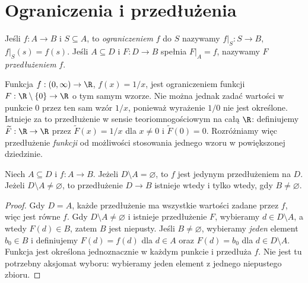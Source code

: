 \section{Ograniczenia i przedłużenia}
\begin{definicja}
Jeśli $f:A\to B$ i $S\subseteq A$, to \emph{ograniczeniem} $f$ do $S$ nazywamy $f|_S:S\to B$, $f|_S(s)=f(s)$. Jeśli $A\subseteq D$ i $F:D\to B$ spełnia $F|_A=f$, nazywamy $F$ \emph{przedłużeniem} $f$.
\end{definicja}
\begin{przyklad}
Funkcja $f:(0,\infty)\to\R$, $f(x)=1/x$, jest ograniczeniem funkcji $F:\R\setminus\{0\}\to\R$ o tym samym wzorze. Nie można jednak zadać wartości w punkcie $0$ przez ten sam wzór $1/x$, ponieważ wyrażenie $1/0$ nie jest określone. Istnieje za to przedłużenie w sensie teoriomnogościowym na całą $\R$: definiujemy $\widetilde F:\R\to\R$ przez $\widetilde F(x)=1/x$ dla $x\ne0$ i $\widetilde F(0)=0$. Rozróżniamy więc przedłużenie \emph{funkcji} od możliwości stosowania jednego wzoru w powiększonej dziedzinie.
\end{przyklad}
\begin{twierdzenie}\label{thm:extension-choice}
Niech $A\subseteq D$ i $f:A\to B$. Jeżeli $D\setminus A=\varnothing$, to $f$ jest jedynym przedłużeniem na $D$. Jeżeli $D\setminus A\ne\varnothing$, to przedłużenie $D\to B$ istnieje wtedy i tylko wtedy, gdy $B\ne\varnothing$.
\end{twierdzenie}
\begin{proof}
Gdy $D=A$, każde przedłużenie ma wszystkie wartości zadane przez $f$, więc jest równe $f$. Gdy $D\setminus A\ne\varnothing$ i istnieje przedłużenie $F$, wybieramy $d\in D\setminus A$, a wtedy $F(d)\in B$, zatem $B$ jest niepusty. Jeśli $B\ne\varnothing$, wybieramy \emph{jeden} element $b_0\in B$ i definiujemy $F(d)=f(d)$ dla $d\in A$ oraz $F(d)=b_0$ dla $d\in D\setminus A$. Funkcja jest określona jednoznacznie w każdym punkcie i przedłuża $f$. Nie jest tu potrzebny aksjomat wyboru: wybieramy jeden element z jednego niepustego zbioru.
\end{proof}

